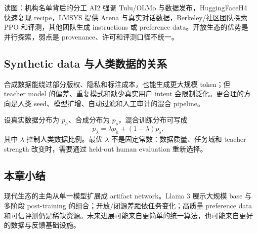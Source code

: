 
\begin{knowledgebox}{读图：机构名单背后的分工}
AI2 强调 Tulu/OLMo 与数据发布，HuggingFaceH4 快速复现 recipe，LMSYS 提供 Arena 与真实对话数据，Berkeley/社区团队探索 PPO 和评测，其他团队生成 instructions 或 preference data。开放生态的优势是并行探索，弱点是 provenance、许可和评测口径不统一。
\end{knowledgebox}


\subsection{Synthetic data 与人类数据的关系}

合成数据能绕过部分版权、隐私和标注成本，也能生成更大规模 token；但 teacher model 的偏差、重复模式和缺少真实用户 intent 会限制泛化。更合理的方向是人类 seed、模型扩增、自动过滤和人工审计的混合 pipeline。

设真实数据分布为 $p_h$、合成分布为 $p_s$，混合训练分布可写成
\[
p_{\lambda}=\lambda p_h+(1-\lambda)p_s,
\]
其中 $\lambda$ 控制人类数据比例。最优 $\lambda$ 不是固定常数：数据质量、任务域和 teacher strength 改变时，需要通过 held-out human evaluation 重新选择。


\subsection{本章小结}

现代生态的主角从单一模型扩展成 artifact network。Llama 3 展示大规模 base 与多阶段 post-training 的组合；开放/闭源差距依任务变化；高质量 preference data 和可信评测仍是稀缺资源。未来进展可能来自更简单的统一算法，也可能来自更好的数据与反馈基础设施。

